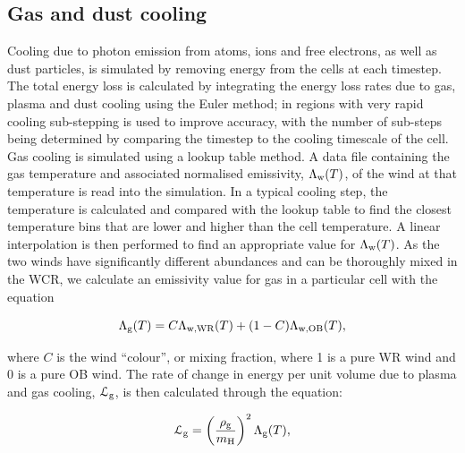 
\subsection{Gas and dust cooling}
\label{sec:gas-dust-cooling}

Cooling due to photon emission from atoms, ions and free electrons, as well as dust particles, is simulated by removing energy from the cells at each timestep.
The total energy loss is calculated by integrating the energy loss rates due to gas, plasma and dust cooling using the Euler method; in regions with very rapid cooling sub-stepping is used to improve accuracy, with the number of sub-steps being determined by comparing the timestep to the cooling timescale of the cell.
Gas cooling is simulated using a lookup table method.
A data file containing the gas temperature and associated normalised emissivity, $\Lambda_\text{w}(T)$, of the wind at that temperature is read into the simulation.
In a typical cooling step, the temperature is calculated and compared with the lookup table to find the closest temperature bins that are lower and higher than the cell temperature.
A linear interpolation is then performed to find an appropriate value for $\Lambda_\text{w} (T)$.
As the two winds have significantly different abundances and can be thoroughly mixed in the WCR, we calculate an emissivity value for gas in a particular cell with the equation

\begin{equation}
  \Lambda_\text{g}(T) = C\Lambda_\text{w,WR}(T) + (1-C)\Lambda_\text{w,OB}(T) , 
\end{equation}

\noindent
where $C$ is the wind ``colour'', or mixing fraction, where 1 is a pure WR wind and 0 is a pure OB wind.
The rate of change in energy per unit volume due to plasma and gas cooling, $\mathcal{L}_\text{g}$, is then calculated through the equation:

\begin{equation}
  \mathcal{L}_\text{g} = \left(\frac{\rho_\text{g}}{m_\text{H}}\right)^2 \Lambda_\text{g}(T),
\end{equation}

